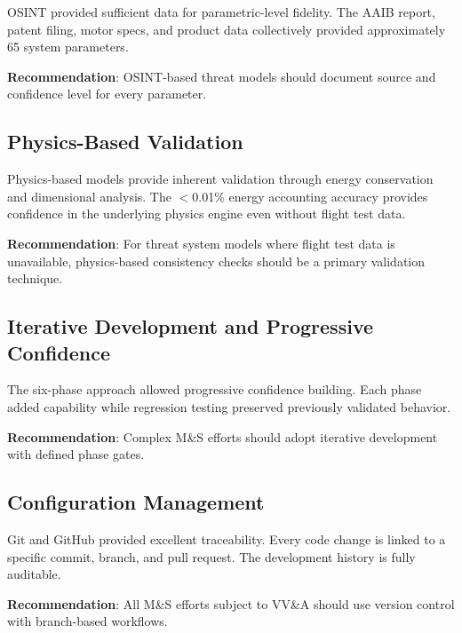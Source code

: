 \documentclass[11pt, letterpaper]{article}
\begin{document}
\unclass OSINT provided sufficient data for parametric-level fidelity. The AAIB report, patent filing, motor specs, and product data collectively provided approximately 65 system parameters.

\unclass \textbf{Recommendation}: OSINT-based threat models should document source and confidence level for every parameter.

\subsection{\unclass Physics-Based Validation}

\unclass Physics-based models provide inherent validation through energy conservation and dimensional analysis. The $<$0.01\% energy accounting accuracy provides confidence in the underlying physics engine even without flight test data.

\unclass \textbf{Recommendation}: For threat system models where flight test data is unavailable, physics-based consistency checks should be a primary validation technique.

\subsection{\unclass Iterative Development and Progressive Confidence}

\unclass The six-phase approach allowed progressive confidence building. Each phase added capability while regression testing preserved previously validated behavior.

\unclass \textbf{Recommendation}: Complex M\&S efforts should adopt iterative development with defined phase gates.

\subsection{\unclass Configuration Management}

\unclass Git and GitHub provided excellent traceability. Every code change is linked to a specific commit, branch, and pull request. The development history is fully auditable.

\unclass \textbf{Recommendation}: All M\&S efforts subject to VV\&A should use version control with branch-based workflows.

\pagebreak

\end{document}
